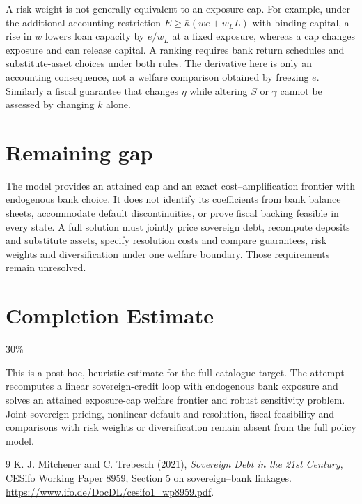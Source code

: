 \documentclass[11pt]{article}
\theoremstyle{definition}
\begin{document}
A risk weight is not generally equivalent to an exposure cap. For example,
under the additional accounting restriction
$E\ge\bar\kappa(we+w_LL)$ with binding capital, a rise in $w$ lowers
loan capacity by $e/w_L$ at a fixed exposure, whereas a cap changes exposure
and can release capital. A ranking requires bank return schedules and
substitute-asset choices under both rules. The derivative here is only an
accounting consequence, not a welfare comparison obtained by freezing $e$.
Similarly a fiscal guarantee that changes $\eta$ while altering $S$ or
$\gamma$ cannot be assessed by changing $k$ alone.

\section*{Remaining gap}
The model provides an attained cap and an exact cost--amplification frontier
with endogenous bank choice. It does not identify its coefficients from bank
balance sheets, accommodate default discontinuities, or prove fiscal backing
feasible in every state. A full solution must jointly price sovereign debt,
recompute deposits and substitute assets, specify resolution costs and
compare guarantees, risk weights and diversification under one welfare
boundary. Those requirements remain unresolved.

\section{Completion Estimate}
30\%

This is a post hoc, heuristic estimate for the full catalogue target.
The attempt recomputes a linear sovereign-credit loop with endogenous bank exposure and solves an attained exposure-cap welfare frontier and robust sensitivity problem. Joint sovereign pricing, nonlinear default and resolution, fiscal feasibility and comparisons with risk weights or diversification remain absent from the full policy model.

\begin{thebibliography}{9}
 K. J. Mitchener and C. Trebesch (2021),
\emph{Sovereign Debt in the 21st Century}, CESifo Working Paper 8959,
Section 5 on sovereign--bank linkages.
\url{https://www.ifo.de/DocDL/cesifo1_wp8959.pdf}.
\end{thebibliography}
\end{document}
